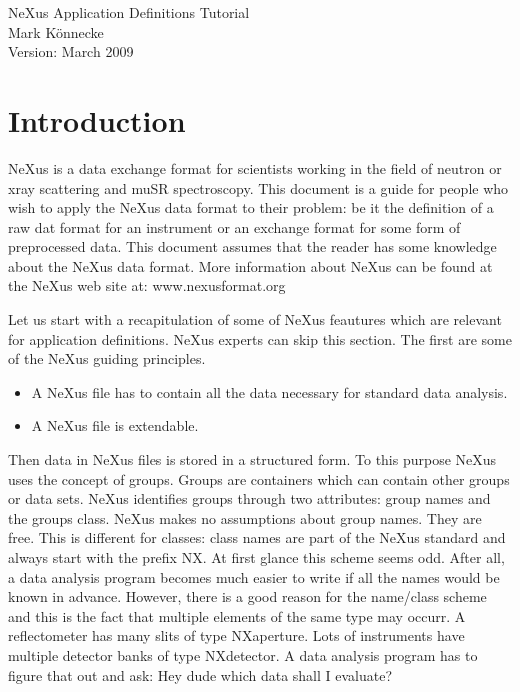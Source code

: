 \documentclass[a4paper]{article}\usepackage[dvips]{graphicx}
\begin{document}
\begin{center}
{\Large NeXus Application Definitions Tutorial }\\
Mark K\"onnecke\\
Version: March 2009\\
\end{center}


\section{Introduction }

NeXus is a data exchange format for scientists working in the field of neutron or xray scattering and 
muSR spectroscopy. This document is a guide for people who wish to apply the NeXus data format to 
their problem: be it the definition of a raw dat format for an instrument or an exchange format for some
form of preprocessed data. This document assumes that the reader has some knowledge about the NeXus 
data format. More information about NeXus can be found at the NeXus web site at: www.nexusformat.org 


Let us start with a recapitulation of some of NeXus feautures which are relevant for application 
definitions. NeXus experts can skip this section. The first are some of the NeXus guiding principles.


\begin{itemize}\item A NeXus file has to contain all the data necessary for standard data analysis.
\item A NeXus file is extendable.
\end{itemize}

Then data in NeXus files is stored in a structured form. To this purpose NeXus uses the concept of groups. Groups 
are containers which can contain other groups or data sets. NeXus identifies groups through two attributes: group names 
and the groups class. NeXus makes no assumptions about  group names. They are free. This is different for classes: 
class names are part of the NeXus standard and always start with the prefix NX.  At first glance this scheme seems odd.
After all, a data analysis program becomes much easier to write if all the names would be known in advance. However, 
there is a good reason for the name/class scheme and this is the fact that multiple elements of the same type may 
occurr. A reflectometer has many slits of type NXaperture. Lots of instruments have multiple detector banks of
 type NXdetector. A data analysis program has to figure that out and ask: Hey dude which data shall I evaluate? 
 
\end{document}
